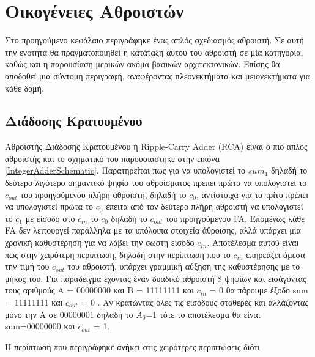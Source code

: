 \section{Οικογένειες Αθροιστών}
Στο προηγούμενο κεφάλαιο περιγράφηκε ένας απλός σχεδιασμός αθροιστή. Σε αυτή την ενότητα θα πραγματοποιηθεί η κατάταξη αυτού του αθροιστή σε μία κατηγορία, καθώς και η παρουσίαση μερικών ακόμα βασικών αρχιτεκτονικών. Επίσης θα αποδοθεί μια σύντομη περιγραφή, αναφέροντας πλεονεκτήματα και μειονεκτήματα για κάθε δομή. 



\subsection{Διάδοσης Κρατουμένου}
Αθροιστής Διάδοσης Κρατουμένου ή Ripple-Carry Adder (RCA) είναι ο πιο απλός αθροιστής και το σχηματικό του παρουσιάστηκε στην εικόνα \ref{IntegerAdderSchematic}. Παρατηρείται πως για να υπολογιστεί το $sum_1$ δηλαδή το δεύτερο λιγότερο σημαντικό ψηφίο του αθροίσματος πρέπει πρώτα να υπολογιστεί το $c_{out}$ του προηγούμενου πλήρη αθροιστή, δηλαδή το $c_0$, αντίστοιχα για το τρίτο πρέπει να υπολογιστεί πρώτα το $c_0$ έπειτα από τον δεύτερο πλήρη αθροιστή να υπολογιστεί το $c_1$ με είσοδο στο $c_{in}$ το $c_0$ δηλαδή το $c_{out}$ του προηγούμενου FA. Επομένως κάθε FA δεν λειτουργεί παράλληλα με τα υπόλοιπα στοιχεία άθροισης, αλλά υπάρχει μια χρονική καθυστέρηση για να λάβει την σωστή είσοδο $c_{in}$. Αποτέλεσμα αυτού είναι πως στην χειρότερη περίπτωση, δηλαδή στην περίπτωση που το $c_{in}$ επηρεάζει άμεσα την τιμή του $c_{out}$ του αθροιστή, υπάρχει γραμμική αύξηση της καθυστέρησης με το μήκος του.
Για παράδειγμα έχοντας έναν δυαδικό αθροιστή 8 ψηφίων και εισάγοντας τους αριθμούς Α = 00000000 και Β = 11111111 και $c_{in}$ = 0 θα πάρουμε έξοδο sum = 11111111 και $c_{out}$ = 0 . Αν κρατώντας όλες τις εισόδους σταθερές και αλλάζοντας μόνο την Α σε 00000001 δηλαδή το $A_0$=1 τότε το αποτέλεσμα θα είναι sum=00000000 και $c_{out}$ = 1. 
\par
Η περίπτωση που περιγράφηκε ανήκει στις χειρότερες περιπτώσεις διότι 


